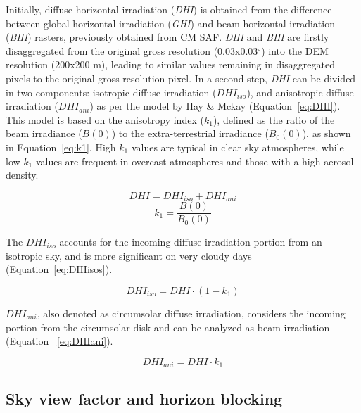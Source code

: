 \documentclass[11pt, english]{article}
\let\cite\citep
\begin{document}
Initially, diffuse horizontal irradiation (\emph{DHI}) is obtained
from the difference between global horizontal irradiation (\emph{GHI})
and beam horizontal irradiation (\emph{BHI}) rasters, previously
obtained from CM SAF. \emph{DHI} and \emph{BHI} are firstly
disaggregated from the original gross resolution (0.03x0.03$^\circ$)
into the DEM resolution (200x200 m), leading to similar values
remaining in disaggregated pixels to the original gross resolution
pixel. In a second step, \emph{DHI} can be divided in two components:
isotropic diffuse irradiation ($DHI_{iso}$), and anisotropic diffuse
irradiation ($DHI_{ani}$) as per the model by Hay \& Mckay
\cite{Hay.Mckay1985} (Equation~\ref{eq:DHI}). This model is based on
the anisotropy index ($k_1$), defined as the ratio of the beam
irradiance ($B(0)$) to the extra-terrestrial irradiance ($B_{0}(0)$),
as shown in Equation~\ref{eq:k1}. High $k_1$ values are typical in
clear sky atmospheres, while low $k_1$ values are frequent in overcast
atmospheres and those with a high aerosol density.

\begin{equation}
\label{eq:DHI}
DHI=DHI_{iso}+DHI_{ani}
\end{equation}
\begin{equation}
\label{eq:k1}
k_{1}=\frac{B(0)}{B_{0}(0)} 
\end{equation}

The $DHI_{iso}$ accounts for the incoming diffuse irradiation portion from an isotropic sky, and is more significant on very cloudy days (Equation~\ref{eq:DHIisos}).

\begin{equation}
\label{eq:DHIisos}
DHI_{iso}=DHI\cdot{}(1-k_{1})
\end{equation}
 
$DHI_{ani}$, also denoted as circumsolar diffuse irradiation, considers the incoming portion from the circumsolar disk and can be analyzed as beam irradiation \cite{Perpinan-Lamigueiro2013} (Equation ~\ref{eq:DHIani}).

\begin{equation}
\label{eq:DHIani}
DHI_{ani}=DHI\cdot{}k_{1}
\end{equation}

\subsection{Sky view factor and horizon blocking}
\label{sec:sky-view-factor}
\end{document}
